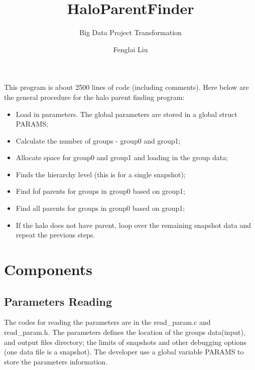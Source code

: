\documentclass[notheorems, aspectratio=54]{beamer}
\title[Halo Parent Finder]{HaloParentFinder}
\subtitle{Big Data Project Transformation}
\author{Fenglai Liu}
\institute[ACCRE]{fenglai@accre.vanderbilt.edu}
\begin{document}
\begin{frame}
    \titlepage
\end{frame}


\begin{frame}

This program is about 2500 lines of code (including comments). Here below are the general 
procedure for the halo parent finding program:
\begin{itemize}
 \item Load in parameters. The global parameters are stored in a global struct PARAMS;
 \item Calculate the number of groups - group0 and group1;
 \item Allocate space for group0 and group1 and loading in the group data; 
 \item Finds the hierarchy level (this is for a single snapshot);
 \item Find fof parents for groups in group0 based on group1;
 \item Find all parents for groups in group0 based on group1;
 \item If the halo does not have parent, loop over the remaining snapshot data and repeat the previous steps.
\end{itemize}


\end{frame}

\section{Components}

\subsection{Parameters Reading}
\begin{frame}

The codes for reading the parameters are in the read\_param.c and read\_param.h. The parameters defines
the location of the groups data(input), and output files directory; the limits of snapshots 
and other debugging options (one data file is a snapshot). The developer use a global variable PARAMS to store 
the parameters information. 

\end{frame}
\end{document}
